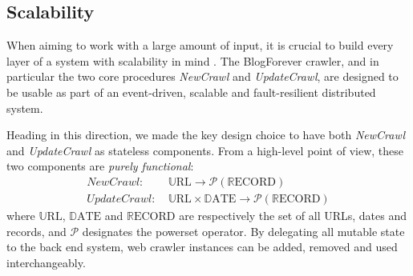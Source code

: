 \subsection{Scalability}
When aiming to work with a large amount of input, it is crucial to build every layer of a system with scalability in mind \cite{thereactivemanifesto2013}. The BlogForever crawler, and in particular the two core procedures \emph{NewCrawl} and \emph{UpdateCrawl}, are designed to be usable as part of an event-driven, scalable and fault-resilient distributed system.

Heading in this direction, we made the key design choice to have both \emph{NewCrawl} and \emph{UpdateCrawl} as stateless components. From a high-level point of view, these two components are \emph{purely functional}:
%
\newcommand\URL{\mathbb{U}\text{RL}}
\newcommand\DATE{\mathbb{D}\text{ATE}}
\newcommand\RECORD{\mathbb{R}\text{ECORD}}
\begin{equation*}
  \begin{split}
    NewCrawl:    &~ \URL \rightarrow \mathcal{P}(\RECORD)\\
    UpdateCrawl: &~ \URL \times \DATE \rightarrow \mathcal{P}(\RECORD)
  \end{split}
\end{equation*}
%
where $\URL$, $\DATE$ and $\RECORD$ are respectively the set of all URLs, dates and records, and $\mathcal{P}$ designates the powerset operator. By delegating all mutable state to the back end system, web crawler instances can be added, removed and used interchangeably.
